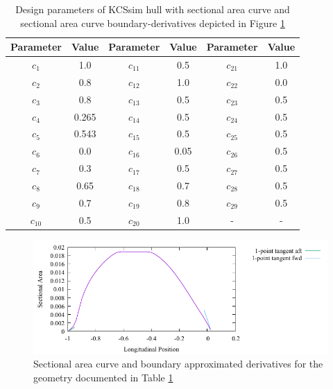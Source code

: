 \documentclass{report}
\begin{document}
\begin{table}[H]
    \centering
    \begin{tabular}{|c|c|c|c|c|c|}
        \hline 
        Parameter & Value & Parameter & Value & Parameter & Value\\
        \hline 
        $c_1$ & 1.0 & $c_{11}$ & 0.5 & $c_{21}$ & 1.0 \\
        \hline 
        $c_2$ & 0.8 & $c_{12}$ & {\color{blue} 1.0} & $c_{22}$ & 0.0\\
        \hline 
        $c_3$ & 0.8 & $c_{13}$ & 0.5 & $c_{23}$ & 0.5 \\
        \hline 
        $c_4$ & 0.265 & $c_{14}$ & 0.5 & $c_{24}$ & 0.5 \\
        \hline 
        $c_5$ & 0.543 & $c_{15}$ & 0.5 & $c_{25}$ & 0.5 \\
        \hline 
        $c_6$ & 0.0 & $c_{16}$ & 0.05 & $c_{26}$ & 0.5 \\
        \hline 
        $c_7$ & 0.3 & $c_{17}$ & 0.5 & $c_{27}$ & 0.5 \\
        \hline 
        $c_8$ & 0.65 & $c_{18}$ & 0.7 & $c_{28}$ & 0.5 \\
        \hline 
        $c_9$ & 0.7 & $c_{19}$ & 0.8 & $c_{29}$ & 0.5 \\
        \hline 
        $c_{10}$ & 0.5 & $c_{20}$ & 1.0 & - & - \\
        \hline 
    \end{tabular}
    \caption{Design parameters of KCSsim hull with sectional area curve and 
    sectional area curve boundary-derivatives depicted in Figure
    \ref{fig:test-4-sac-4}}
    \label{tab:test-4-4}
\end{table}
\begin{figure}[H]
    \centering
    \includegraphics[width = 0.7\linewidth]{figures/test-4-sac-4.pdf}
    \caption{Sectional area curve and boundary approximated derivatives for
    the geometry documented in Table \ref{tab:test-4-4}}
    \label{fig:test-4-sac-4}
\end{figure}
\end{document}
